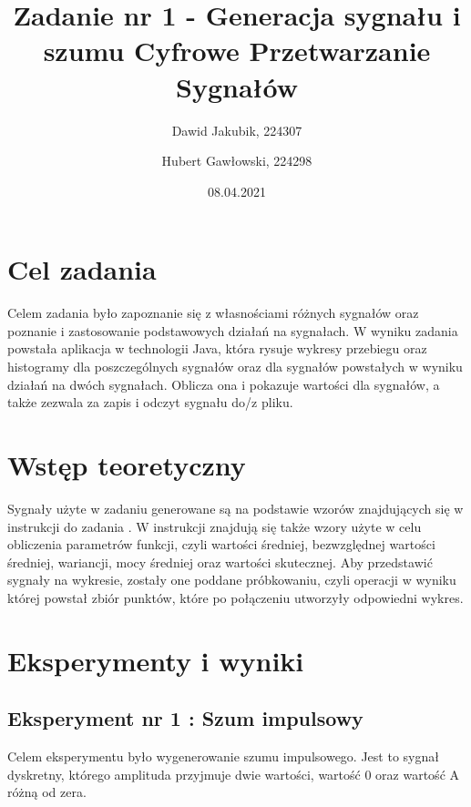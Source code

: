 \documentclass[12pt]{article}
\title{{\bf Zadanie nr 1 - Generacja sygnału i szumu}\linebreak
Cyfrowe Przetwarzanie Sygnałów}
\author{Dawid Jakubik, 224307 \and Hubert Gawłowski, 224298}
\date{08.04.2021}
\begin{document}
\clearpage\maketitle
\thispagestyle{empty}
\newpage
\setcounter{page}{1}
\section{Cel zadania}

Celem zadania było zapoznanie się z własnościami różnych sygnałów oraz poznanie i zastosowanie podstawowych działań na sygnałach. W wyniku zadania powstała aplikacja w technologii Java, która rysuje wykresy przebiegu oraz histogramy dla poszczególnych sygnałów oraz dla sygnałów powstałych w wyniku działań na dwóch sygnałach. Oblicza ona i pokazuje wartości dla sygnałów, a także zezwala za zapis i odczyt sygnału do/z pliku.

\section{Wstęp teoretyczny}

Sygnały użyte w zadaniu generowane są na podstawie wzorów znajdujących się w instrukcji do zadania \cite{instrukcja}. W instrukcji \cite{instrukcja} znajdują się także wzory użyte w celu obliczenia parametrów funkcji, czyli wartości średniej, bezwzględnej wartości średniej, wariancji, mocy średniej oraz wartości skutecznej. Aby przedstawić sygnały na wykresie, zostały one poddane próbkowaniu, czyli operacji w wyniku której powstał zbiór punktów, które po połączeniu utworzyły odpowiedni wykres.


\section{Eksperymenty i wyniki}


\subsection{Eksperyment nr 1 : Szum impulsowy}

Celem eksperymentu było wygenerowanie szumu impulsowego. Jest to sygnał dyskretny, którego amplituda przyjmuje dwie wartości, wartość 0 oraz wartość A różną od zera.
\end{document}
